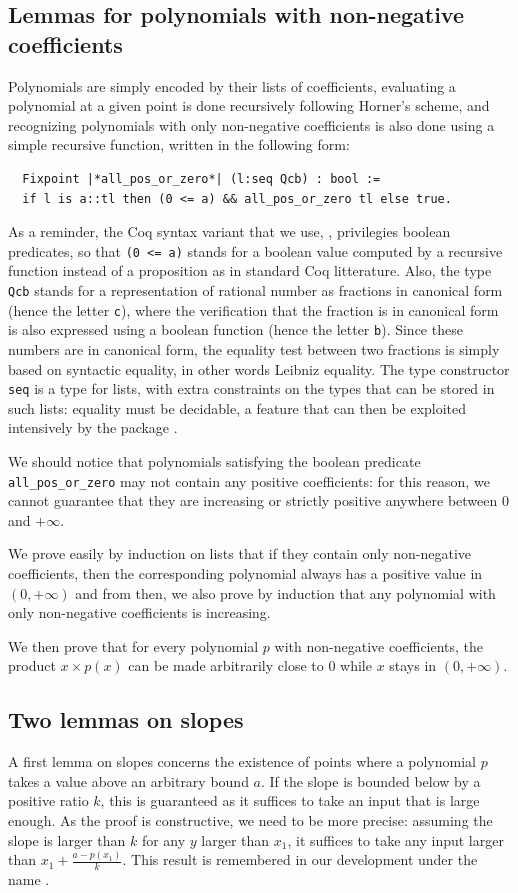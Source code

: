 \documentclass{mscs}
\begin{document}
\subsection{Lemmas for polynomials with non-negative coefficients}
Polynomials are simply encoded by their lists of coefficients, evaluating
a polynomial at a given point is done recursively following Horner's scheme,
and recognizing polynomials with only non-negative coefficients is also
done using a simple recursive function, written in the following form:
\begin{lstlisting}
  Fixpoint |*all_pos_or_zero*| (l:seq Qcb) : bool :=
  if l is a::tl then (0 <= a) && all_pos_or_zero tl else true.
\end{lstlisting}
As a reminder, the Coq syntax variant that we use, \ssr{},
privilegies boolean predicates, so that {\tt (0 <= a)} stands for a boolean
value computed by a recursive function instead of a proposition as in
standard Coq litterature.  Also, the type {\tt Qcb} stands for a
representation of
rational number as fractions in canonical form (hence the letter {\tt c}), where
the verification that the fraction is in canonical form is also expressed
using a boolean function (hence the letter {\tt b}).  Since these numbers
are in canonical form, the equality test between two fractions is simply based
on syntactic equality, in other words Leibniz equality.  The type constructor
{\tt seq} is a type for lists, with extra constraints on the types
that can be
stored in such lists: equality must be decidable, a feature that can then be
exploited intensively by the \ssr{} package
\cite{GONTHIER:2008:INRIA-00258384:4}.

We should notice that polynomials satisfying the boolean predicate
{\tt all\_pos\_or\_zero} may not contain any positive coefficients: for this
reason, we cannot guarantee that they are increasing or strictly positive
anywhere between 0 and \(+\infty\).

We prove easily by induction on lists that if they contain only non-negative
coefficients, then the corresponding polynomial always has a positive value
in \((0,+\infty)\) and from then, we also prove by induction that
any polynomial with only non-negative coefficients is increasing.

We then prove that for every polynomial \(p\)  with non-negative coefficients,
the product \(x \times p(x)\) can be made arbitrarily close to 0 while
$x$ stays in \((0,+\infty)\).

\subsection{Two lemmas on slopes}
A first lemma on slopes concerns the existence of points where a
polynomial \(p\) takes a value above an arbitrary bound \(a\).  If the slope
is bounded below by a positive ratio \(k\), this is guaranteed as it
suffices to take an input that is large enough.  As the proof is
constructive, we need to be more precise: assuming the slope is larger
than \(k\) for any \(y\) larger than \(x_1\), it suffices to take any
input larger than \(x_1 + \frac{a - p(x_1)}{k}\).  This result is
remembered in our development under the name .
\end{document}
